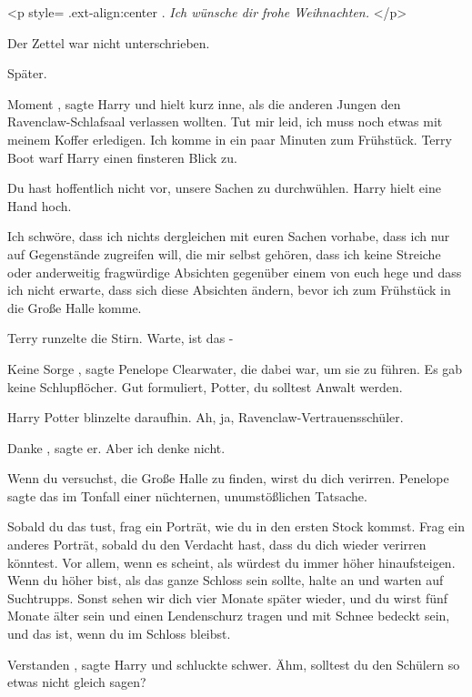 <p style=\grqq{} .ext-align:center\grqq{} .\emph{ Ich wünsche dir frohe
Weihnachten. }</p>

Der Zettel war nicht unterschrieben.

Später.

\glqq Moment\grqq{} , sagte Harry und hielt kurz inne, als die anderen Jungen
den Ravenclaw-Schlafsaal verlassen wollten. \glqq Tut mir leid, ich muss noch
etwas mit meinem Koffer erledigen. Ich komme in ein paar Minuten zum
Frühstück.\grqq{} Terry Boot warf Harry einen finsteren Blick zu.

\glqq Du hast hoffentlich nicht vor, unsere Sachen zu durchwühlen.\grqq{} Harry
hielt eine Hand hoch.

\glqq Ich schwöre, dass ich nichts dergleichen mit euren Sachen vorhabe, dass
ich nur auf Gegenstände zugreifen will, die mir selbst gehören, dass ich keine
Streiche oder anderweitig fragwürdige Absichten gegenüber einem von euch hege
und dass ich nicht erwarte, dass sich diese Absichten ändern, bevor ich zum
Frühstück in die Große Halle komme.\grqq{}

Terry runzelte die Stirn. \glqq Warte, ist das -\grqq{}

\glqq Keine Sorge\grqq{} , sagte Penelope Clearwater, die dabei war, um sie zu
führen. \glqq Es gab keine Schlupflöcher. Gut formuliert, Potter, du solltest
Anwalt werden.\grqq{}

Harry Potter blinzelte daraufhin. Ah, ja, Ravenclaw-Vertrauensschüler.

\glqq Danke\grqq{} , sagte er. \glqq Aber ich denke nicht.\grqq{}

\glqq Wenn du versuchst, die Große Halle zu finden, wirst du dich
verirren.\grqq{} Penelope sagte das im Tonfall einer nüchternen, unumstößlichen
Tatsache.

\glqq Sobald du das tust, frag ein Porträt, wie du in den ersten Stock kommst.
Frag ein anderes Porträt, sobald du den Verdacht hast, dass du dich wieder
verirren könntest. Vor allem, wenn es scheint, als würdest du immer höher
hinaufsteigen. Wenn du höher bist, als das ganze Schloss sein sollte, halte an
und warten auf Suchtrupps. Sonst sehen wir dich vier Monate später wieder, und
du wirst fünf Monate älter sein und einen Lendenschurz tragen und mit Schnee
bedeckt sein, und das ist, wenn du im Schloss bleibst.\grqq{}

\glqq Verstanden\grqq{} , sagte Harry und schluckte schwer. \glqq Ähm, solltest
du den Schülern so etwas nicht gleich sagen?\grqq{}

